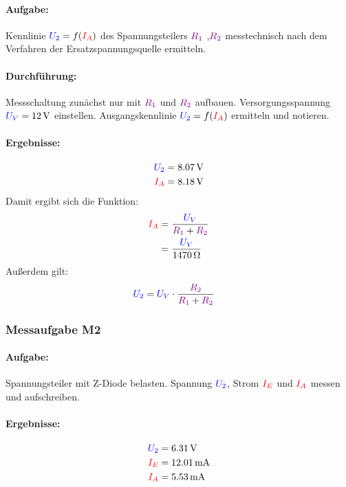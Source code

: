 \documentclass[11pt,a4paper,titlepage]{scrreprt}
\begin{document}
                  \paragraph{Aufgabe:} Kennlinie $\textcolor{blue}{U_2}= f(\textcolor{red}{I_A})$ des Spannungsteilers $\textcolor{violet}{R_1}$ ,$\textcolor{violet}{R_2}$ messtechnisch nach dem Verfahren der Ersatzspannungsquelle ermitteln.
                  \paragraph{Durchführung:} Messschaltung zunächst nur mit $\textcolor{violet}{R_1}$ und $\textcolor{violet}{R_2}$ aufbauen. Versorgungsspannung
                  $\textcolor{blue}{U_V} = \SI{12}{\volt}$ einstellen. Ausgangskennlinie $\textcolor{blue}{U_2}= f(\textcolor{red}{I_A})$ ermitteln und notieren.

                  \paragraph{Ergebnisse:}
                  \begin{align*}
                      \textcolor{blue}{U_2} &= \SI{8,07}{\volt}\\
                      \textcolor{red}{I_A} &= \SI{8,18}{\volt}
                  \end{align*}
                  Damit ergibt sich die Funktion:
                  \begin{align*}
                      \textcolor{red}{I_A} &=\frac{\textcolor{blue}{U_V}}{\textcolor{violet}{R_1} + \textcolor{violet}{R_2}}\\
                                     &=\frac{\textcolor{blue}{U_V}}{\SI{1470}{\ohm}}
                  \end{align*}
                  Außerdem gilt:
                  \begin{align*}
                  	  \textcolor{blue}{U_2} &=\textcolor{blue}{U_V} \cdot \frac{\textcolor{violet}{R_2}}{\textcolor{violet}{R_1} + \textcolor{violet}{R_2}}
                  \end{align*}
              \subsubsection{Messaufgabe M2}
                  \paragraph{Aufgabe:}Spannungsteiler mit Z-Diode belasten. Spannung $\textcolor{blue}{U_2}$, Strom $\textcolor{red}{I_E}$ und $\textcolor{red}{I_A}$ messen und aufschreiben.
                  \paragraph{Ergebnisse:}
                  \begin{align*}
                      \textcolor{blue}{U_2} &= \SI{6,31}{\volt}\\
                          \textcolor{red}{I_E} &= \SI{12,01}{\milli\ampere}\\
                          \textcolor{red}{I_A} &= \SI{5,53}{\milli\ampere}
                  \end{align*}
\end{document}
